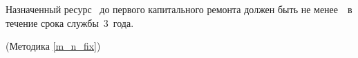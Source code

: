 Назначенный ресурс \dut \ до первого капитального ремонта должен быть не менее~\tnfix \ в течение срока службы~3~года.

\begin{flushright}
	(Методика \ref{m_n_fix})
\end{flushright}